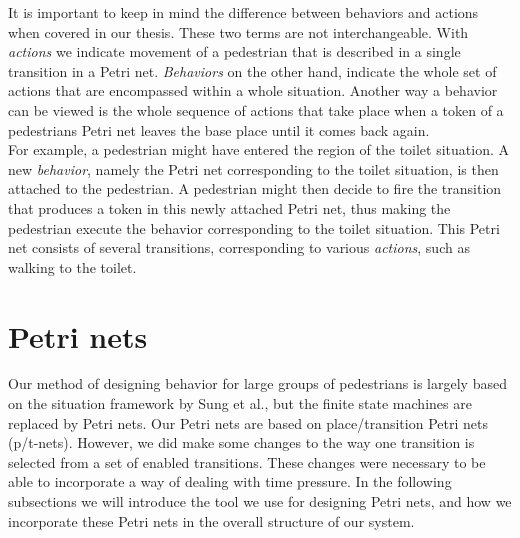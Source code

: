 \documentclass[11pt, a4paper]{book}
\begin{document}
It is important to keep in mind the difference between behaviors and actions when covered in our thesis. These two terms are not interchangeable. With \emph{actions} we indicate movement of a pedestrian that is described in a single transition in a Petri net. \emph{Behaviors} on the other hand, indicate the whole set of actions that are encompassed within a whole situation. Another way a behavior can be viewed is the whole sequence of actions that take place when a token of a pedestrians Petri net leaves the base place until it comes back again. \\
For example, a pedestrian might have entered the region of the toilet situation. A new \emph{behavior}, namely the Petri net corresponding to the toilet situation, is then attached to the pedestrian. A pedestrian might then decide to fire the transition that produces a token in this newly attached Petri net, thus making the pedestrian execute the behavior corresponding to the toilet situation. This Petri net consists of several transitions, corresponding to various \emph{actions}, such as walking to the toilet.\\


\section{Petri nets}
Our method of designing behavior for large groups of pedestrians is largely based on the situation framework by Sung et al., but the finite state machines are replaced by Petri nets.
Our Petri nets are based on place/transition Petri nets (p/t-nets)\cite{desel1998place}. However, we did make some changes to the way one transition is selected from a set of enabled transitions. These changes were necessary to be able to incorporate a way of dealing with time pressure. In the following subsections we will introduce the tool we use for designing Petri nets, and how we incorporate these Petri nets in the overall structure of our system.
\end{document}
